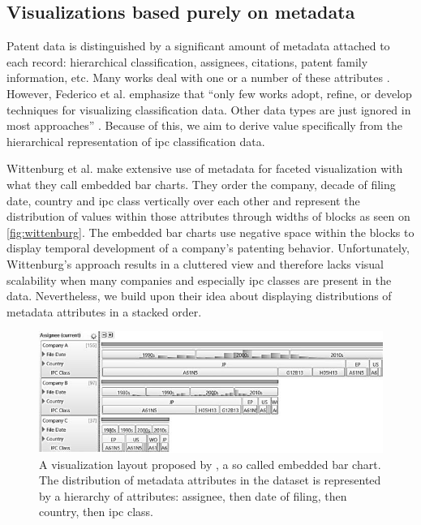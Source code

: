 \subsection{Visualizations based purely on metadata}

Patent data is distinguished by a significant amount of metadata attached to each record: hierarchical classification, assignees, citations, patent family information, etc.
Many works deal with one or a number of these attributes \cite{Zhao2013} \cite{Wittenburg2015} \cite{Herr2014a} \cite{Giereth2007} \cite{Garfield2004} \cite{Chen2004} \cite{abello}.
However, Federico et al. emphasize that “only few works adopt, refine, or develop techniques for visualizing classification data. Other data types are just ignored in most approaches” \cite{Federico2017}.
Because of this, we aim to derive value specifically from the hierarchical representation of \gls{ipc} classification data.

Wittenburg et al. \cite{Wittenburg2015} make extensive use of metadata for faceted visualization with what they call embedded bar charts.
They order the company, decade of filing date, country and \gls{ipc} class vertically over each other and represent the distribution of values within those attributes through widths of blocks as seen on \autoref{fig:wittenburg}.
The embedded bar charts use negative space within the blocks to display temporal development of a company's patenting behavior.
Unfortunately, Wittenburg's approach results in a cluttered view and therefore lacks visual scalability when many companies and especially \gls{ipc} classes are present in the data.
Nevertheless, we build upon their idea about displaying distributions of metadata attributes in a stacked order.

\begin{figure}[!]
\centering
\includegraphics[width=\textwidth]{img/wittenburg}
\caption{A visualization layout proposed by \cite{Wittenburg2015}, a so called embedded bar chart. The distribution of metadata attributes in the dataset is represented by a hierarchy of attributes: assignee, then date of filing, then country, then \gls{ipc} class.}
\label{fig:wittenburg}
\end{figure}

